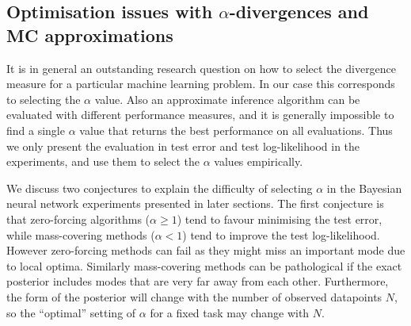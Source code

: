 %

\subsection{Optimisation issues with $\alpha$-divergences and MC approximations}
\label{sec:chap4_vrbound_opt_mc}

It is in general an outstanding research question on how to select the divergence measure for a particular machine learning problem. In our case this corresponds to selecting the $\alpha$ value. Also an approximate inference algorithm can be evaluated with different performance measures, and it is generally impossible to find a single $\alpha$ value that returns the best performance on all evaluations. Thus we only present the evaluation in test error and test log-likelihood in the experiments, and use them to select the $\alpha$ values empirically. 

We discuss two conjectures to explain the difficulty of selecting $\alpha$ in the Bayesian neural network experiments presented in later sections. The first conjecture is that zero-forcing algorithms ($\alpha \geq 1$) tend to favour minimising the test error, while mass-covering methods ($\alpha < 1$) tend to improve the test log-likelihood. However zero-forcing methods can fail as they might miss an important mode due to local optima. Similarly mass-covering methods can be pathological if the exact posterior includes modes that are very far away from each other. Furthermore, the form of the posterior will change with the number of observed datapoints $N$, so the ``optimal'' setting of $\alpha$ for a fixed task may change with $N$. 

